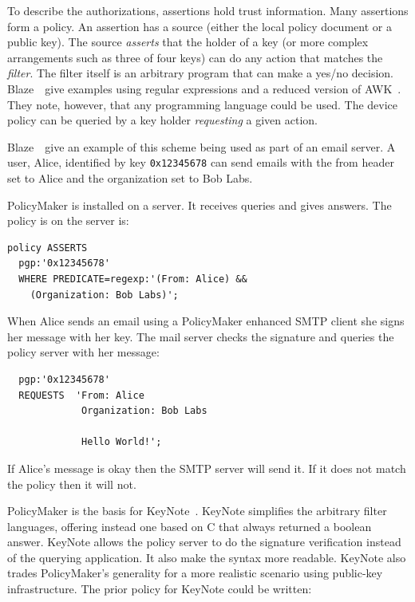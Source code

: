 \documentclass[thesis.tex]{subfiles}
\begin{document}
To describe the authorizations, assertions hold trust information.
Many assertions form a policy. An assertion has a source (either
the local policy document or a public key). The source \emph{asserts} that the holder of a key
(or more complex arrangements such as three of four keys) can do any action that matches the \emph{filter}. The filter itself is
an arbitrary program that can make a yes/no decision.
Blaze~\etal~give examples using regular expressions and a reduced version of
AWK~\cite{aho_awk-pattern_1979}. They note, however, that
any programming language could be used. The device policy can be queried by a
key holder \emph{requesting} a given action.

Blaze~\etal~give an example of this scheme being used as part of an email
server. A user, Alice, identified by key \texttt{0x12345678} can
send emails with the from header set to Alice and the organization set to Bob
Labs.

PolicyMaker is installed on a server. It receives queries and gives answers.
The policy is on the server is:

\begin{lstlisting}
policy ASSERTS
  pgp:'0x12345678'
  WHERE PREDICATE=regexp:'(From: Alice) &&
    (Organization: Bob Labs)';
\end{lstlisting}

When Alice sends an email using a PolicyMaker enhanced SMTP
client she signs her message with her key.  The mail server
checks the signature and queries the policy server with her message:

\begin{lstlisting}
  pgp:'0x12345678'
  REQUESTS  'From: Alice
             Organization: Bob Labs

             Hello World!';
\end{lstlisting}

If Alice's message is okay then the SMTP server will send it.  If it does not match the policy then it will not.

PolicyMaker is the basis for KeyNote~\cite{blaze_role_1999,blaze_keynote:_1998}.  KeyNote simplifies the
 arbitrary filter languages, offering instead one
based on C that always returned a boolean answer. KeyNote allows the policy
server to do the signature verification instead of the querying
application. It also make the syntax more readable.  KeyNote also trades PolicyMaker's generality for a more realistic
scenario using public-key infrastructure.  The prior policy for KeyNote could be written:
\end{document}
